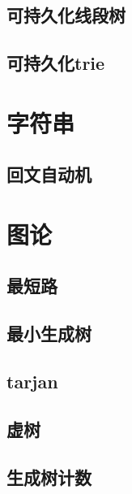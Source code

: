 \documentclass[UTF8,a4paper]{ctexart}
\begin{document}
\subsection{可持久化线段树}

\subsection{可持久化trie}

\section{字符串}











\subsection{回文自动机}

\section{图论}

\subsection{最短路}

\subsection{最小生成树}



\subsection{tarjan}

\subsection{虚树}

\subsection{生成树计数}
\end{document}
